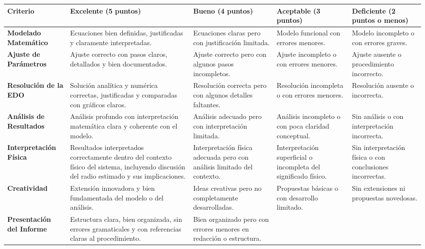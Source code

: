 \documentclass[oneside,letter,spanish,activeacute,english,links,10pt]{amcaGCS_EDO}
\begin{document}
\begin{table}[h!]
	\centering
	\footnotesize
	\renewcommand{\arraystretch}{1.25}
	\begin{tabular}{|p{2.0cm}|p{3.3cm}|p{2.8cm}|p{2.8cm}|p{2.8cm}|}
		\hline
		\textbf{Criterio}
		& \textbf{Excelente (5 puntos)}
		& \textbf{Bueno (4 puntos)}
		& \textbf{Aceptable (3 puntos)}
		& \textbf{Deficiente (2 puntos o menos)} \\
		\hline
		\textbf{Modelado Matemático}
		& Ecuaciones bien definidas, justificadas y claramente interpretadas.
		& Ecuaciones claras pero con justificación limitada.
		& Modelo funcional con errores menores.
		& Modelo incompleto o con errores graves. \\
		\hline
		\textbf{Ajuste de Parámetros}
		& Ajuste correcto con pasos claros, detallados y bien documentados.
		& Ajuste correcto pero con algunos pasos incompletos.
		& Ajuste incompleto o con errores menores.
		& Ajuste ausente o procedimiento incorrecto. \\
		\hline
		\textbf{Resolución de la EDO}
		& Solución analítica y numérica correctas, justificadas y comparadas con gráficos claros.
		& Resolución correcta pero con algunos detalles faltantes.
		& Resolución incompleta o con errores menores.
		& Resolución ausente o incorrecta. \\
		\hline
		\textbf{Análisis de Resultados}
		& Análisis profundo con interpretación matemática clara y coherente con el modelo.
		& Análisis adecuado pero con interpretación limitada.
		& Análisis incompleto o con poca claridad conceptual.
		& Sin análisis o con interpretación incorrecta. \\
		\hline
		\textbf{Interpretación Física}
		& Resultados interpretados correctamente dentro del contexto físico del sistema, incluyendo discusión del radio estimado y sus implicaciones.
		& Interpretación física adecuada pero con análisis limitado del contexto.
		& Interpretación superficial o incompleta del significado físico.
		& Sin interpretación física o con conclusiones incorrectas. \\
		\hline
		\textbf{Creatividad}
		& Extensión innovadora y bien fundamentada del modelo o del análisis.
		& Ideas creativas pero no completamente desarrolladas.
		& Propuestas básicas o con desarrollo limitado.
		& Sin extensiones ni propuestas novedosas. \\
		\hline
		\textbf{Presentación del Informe}
		& Estructura clara, bien organizada, sin errores gramaticales y con referencias claras al procedimiento.
		& Bien organizado pero con errores menores en redacción o estructura.

\end{tabular}
\end{table}
\end{document}
